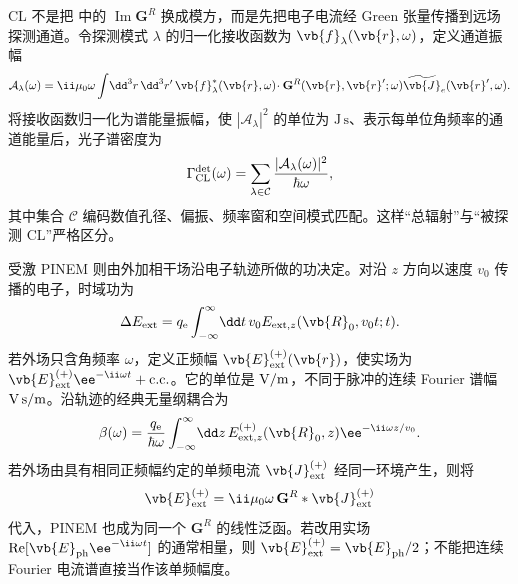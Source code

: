 \begin{definition}[收集通道振幅与光子谱]
CL 不是把 中的 $\operatorname{Im}\mathbf G^R$ 换成模方，而是先把电子电流经 Green 张量传播到远场探测通道。令探测模式 $\lambda$ 的归一化接收函数为 $\vb{f}_\lambda(\vb{r},\omega)$，定义通道振幅
\begin{equation}
 \mathcal A_\lambda(\omega)
 =\ii\mu_0\omega
 \int\!\dd^3 r\,\dd^3 r'\,
 \vb{f}_\lambda^*(\vb{r},\omega)\!\cdot
 \mathbf G^R(\vb{r},\vb{r}';\omega)
 \widetilde{\vb{J}}_e(\vb{r}',\omega).
\label{eq:cl_channel_amplitude_dp47}
\end{equation}
将接收函数归一化为谱能量振幅，使 $|\mathcal A_\lambda|^2$ 的单位为 $\mathrm{J\,s}$、表示每单位角频率的通道能量后，光子谱密度为
\begin{equation}
{
 \Gamma_{\rm CL}^{\rm det}(\omega)
 =\sum_{\lambda\in\mathcal C}
 \frac{|\mathcal A_\lambda(\omega)|^2}{\hbar\omega},}
\label{eq:cl_detected_green_master_dp47}
\end{equation}
其中集合 $\mathcal C$ 编码数值孔径、偏振、频率窗和空间模式匹配。这样“总辐射”与“被探测 CL”严格区分。

\end{definition}

\begin{proposition}[相干驱动的轨迹积分]
受激 PINEM 则由外加相干场沿电子轨迹所做的功决定。对沿 $z$ 方向以速度 $v_0$ 传播的电子，时域功为
\begin{equation}
{
 \Delta E_{\rm ext}
 =q_{\mathrm e}\int_{-\infty}^{\infty}\!\dd t\,
 v_0 E_{{\rm ext},z}(\vb{R}_0,v_0t;t).}
\label{eq:pinem_time_domain_work_dp68}
\end{equation}
若外场只含角频率 $\omega$，定义正频幅 $\vb{E}_{\rm ext}^{(+)}(\vb{r})$，使实场为 $\vb{E}_{\rm ext}^{(+)}\ee^{-\ii\omega t}+\mathrm{c.c.}$。它的单位是 ${\rm V/m}$，不同于脉冲的连续 Fourier 谱幅 ${\rm V\,s/m}$。沿轨迹的经典无量纲耦合为
\begin{equation}
{
 \beta(\omega)
 =\frac{q_{\mathrm e}}{\hbar\omega}
 \int_{-\infty}^{\infty}\!\dd z\,
 E_{{\rm ext},z}^{(+)}(\vb{R}_0,z)
 \ee^{-\ii\omega z/v_0}.}
\label{eq:pinem_beta_green_unified_dp47}
\end{equation}
若外场由具有相同正频幅约定的单频电流 $\vb{J}_{\rm ext}^{(+)}$ 经同一环境产生，则将
\begin{equation*}
 \vb{E}_{\rm ext}^{(+)}
 =\ii\mu_0\omega\,\mathbf G^R*\vb{J}_{\rm ext}^{(+)}
\end{equation*}
代入，PINEM 也成为同一个 $\mathbf G^R$ 的线性泛函。若改用实场 $\operatorname{Re}[\vb{E}_{\rm ph}\ee^{-\ii\omega t}]$ 的通常相量，则 $\vb{E}_{\rm ext}^{(+)}=\vb{E}_{\rm ph}/2$；不能把连续 Fourier 电流谱直接当作该单频幅度。

\end{proposition}

